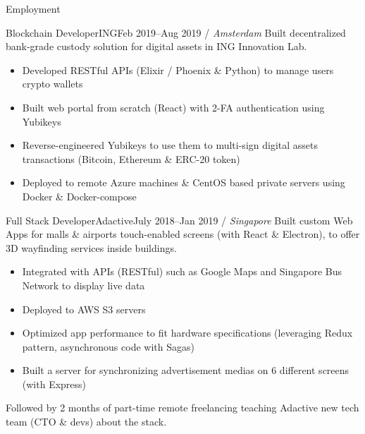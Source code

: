 \documentclass[]{mcdowellcv}
\begin{document}
    \begin{cvsection}{Employment}

        \begin{cvsubsection}{Blockchain Developer}{ING}{Feb 2019--Aug 2019 / \textit{Amsterdam}}
            Built decentralized bank-grade custody solution for digital assets in ING Innovation Lab.
            \begin{itemize}
                \item Developed RESTful APIs (Elixir / Phoenix \& Python) to manage users crypto wallets
                \item Built web portal from scratch (React) with 2-FA authentication using Yubikeys
                \item Reverse-engineered Yubikeys to use them to multi-sign digital assets transactions (Bitcoin, Ethereum \& ERC-20 token)
                \item Deployed to remote Azure machines \& CentOS based private servers using Docker \& Docker-compose
            \end{itemize}
        \end{cvsubsection}

        \begin{cvsubsection}{Full Stack Developer}{Adactive}{July 2018--Jan 2019 / \textit{Singapore}}
            Built custom Web Apps for malls \& airports touch-enabled screens (with React \& Electron), to offer 3D wayfinding services inside buildings.
            \begin{itemize}
                \item Integrated with APIs (RESTful) such as Google Maps and Singapore Bus Network to display live data
                \item Deployed to AWS S3 servers
                \item Optimized app performance to fit hardware specifications (leveraging Redux pattern, asynchronous code with Sagas)
                \item Built a server for synchronizing advertisement medias on 6 different screens (with Express)
            \end{itemize}
            Followed by 2 months of part-time remote freelancing teaching Adactive new tech team (CTO \& devs) about the stack.
        \end{cvsubsection}


\end{cvsection}
\end{document}
